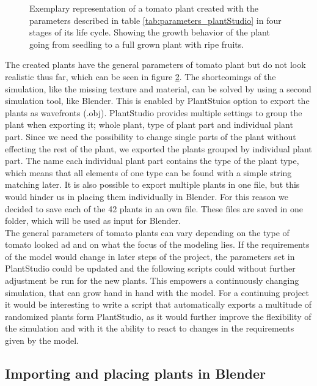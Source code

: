 \begin{figure}[ht]
\begin{subfigure}{.24\textwidth}
		\label{fig:sub4}
	\end{subfigure}%
	\caption{Exemplary representation of a tomato plant created with the parameters described in table \ref{tab:parameters_plantStudio} in four stages of its life cycle. Showing the growth behavior of the plant going from seedling to a full grown plant with ripe fruits.}
	\label{fig:plantStudio}
	\vspace{-10pt}
\end{figure} 


The created plants have the general parameters of tomato plant but do not look realistic thus far, which can be seen in figure \ref{fig:plantStudio}. The shortcomings of the simulation, like the missing texture and material, can be solved by using a second simulation tool, like Blender. This is enabled by PlantStuios option to export the plants as wavefronts (.obj). PlantStudio provides multiple settings to group the plant when exporting it; whole plant, type of plant part and individual plant part. Since we need the possibility to change single parts of the plant without effecting the rest of the plant, we exported the plants grouped by individual plant part. The name each individual plant part contains the type of the plant type, which means that all elements of one type can be found with a simple string matching later. It is also possible to export multiple plants in one file, but this would hinder us in placing them individually in Blender. For this reason we decided to save each of the 42 plants in an own file. These files are saved in one folder, which will be used as input for Blender. \\

The general parameters of tomato plants can vary depending on the type of tomato looked ad and on what the focus of the modeling lies. If the requirements of the model would change in later steps of the project, the parameters set in PlantStudio could be updated and the following scripts could without further adjustment be run for the new plants. This empowers a continuously changing simulation, that can grow hand in hand with the model. For a continuing project it would be interesting to write a script that automatically exports a multitude of randomized plants form PlantStudio, as it would further improve the flexibility of the simulation and with it the ability to react to changes in the requirements given by the model.


\subsection{Importing and placing plants in Blender}



